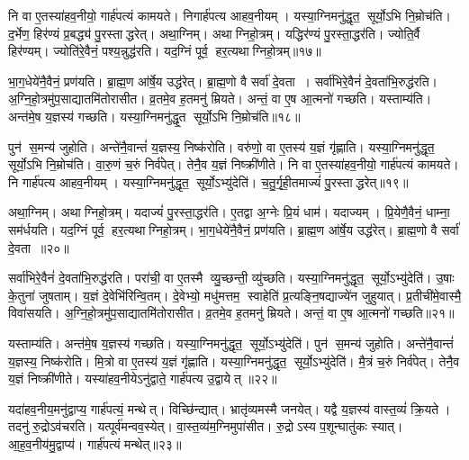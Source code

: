 नि वा ए॒तस्या॑हव॒नीयो॒ गार्\mbox{}ह॑पत्यं कामयते।
निगार्\mbox{}ह॑पत्य आहव॒नीयम्।
यस्या॒ग्निमनु॑द्धृत॒ सूर्यो॒ऽभि नि॒म्रोच॑ति।
द॒र्भेण॒ हिर॑ण्यं प्र॒बद्ध्य॑ पु॒रस्ताद्धरेत्।
अथा॒ग्निम्।
अथाग्निहो॒त्रम्।
यद्धिर॑ण्यं पु॒रस्ता॒द्धर॑ति।
ज्योति॒र्वै हिर॑ण्यम्।
ज्योति॑रे॒वैनं॒ पश्य॒न्नुद्ध॑रति।
यद॒ग्निं पूर्व॒ हर॒त्यथाग्निहो॒त्रम्॥१७॥

भा॒ग॒धेये॑नै॒वैनं॒ प्रण॑यति।
ब्रा॒ह्म॒ण आ॑र्\mbox{}षे॒य उद्ध॑रेत्।
ब्रा॒ह्म॒णो वै सर्वा॑ दे॒वता।
सर्वा॑भिरे॒वैनं॑ दे॒वता॑भि॒रुद्ध॑रति।
अ॒ग्नि॒हो॒त्रमु॑प॒साद्यातमि॑तोरासीत।
व्र॒तमे॒व ह॒तमनु॑ म्रियते।
अन्तं॒ वा ए॒ष आ॒त्मनो॑ गच्छति।
यस्ताम्य॑ति।
अन्त॑मे॒ष य॒ज्ञस्य॑ गच्छति।
यस्या॒ग्निमनु॑द्धृ॒त सूर्यो॒ऽभि नि॒म्रोच॑ति॥१८॥

पुन॑ स॒मन्य॑ जुहोति।
अन्ते॑नै॒वान्तं॑ य॒ज्ञस्य॒ निष्क॑रोति।
वरु॑णो॒ वा ए॒तस्य॑ य॒ज्ञं गृ॑ह्णाति।
यस्या॒ग्निमनु॑द्धृत॒ सूर्यो॒ऽभि नि॒म्रोच॑ति।
वा॒रु॒णं च॒रुं निर्व॑पेत्।
तेनै॒व य॒ज्ञं निष्क्री॑णीते।
नि वा ए॒तस्या॑हव॒नीयो॒ गार्\mbox{}ह॑पत्यं कामयते।
नि गार्\mbox{}ह॑पत्य आहव॒नीयम्।
यस्या॒ग्निमनु॑द्धृत॒ सूर्यो॒ऽभ्यु॑देति॑।
च॒तु॒र्गृ॒ही॒तमाज्यं॑ पु॒रस्ताद्धरेत्॥१९॥

अथा॒ग्निम्।
अथाग्निहो॒त्रम्।
यदाज्यं॑ पु॒रस्ता॒द्धर॑ति।
ए॒तद्वा अ॒ग्नेः प्रि॒यं धाम॑।
यदाज्यम्।
प्रि॒येणै॒वैनं॒ धाम्ना॒ सम॑र्धयति।
यद॒ग्निं पूर्व॒ हर॒त्यथाग्निहो॒त्रम्।
भा॒ग॒धेये॑नै॒वैनं॒ प्रण॑यति।
ब्रा॒ह्म॒ण आ॑र्\mbox{}षे॒य उद्ध॑रेत्।
ब्रा॒ह्म॒णो वै सर्वा॑ दे॒वता॥२०॥

सर्वा॑भिरे॒वैनं॑ दे॒वता॑भि॒रुद्ध॑रति।
परा॑ची॒ वा ए॒तस्मै व्यु॒च्छन्ती॒ व्यु॑च्छति।
यस्या॒ग्निमनु॑द्धृत॒ सूर्यो॒ऽभ्यु॑देति॑।
उ॒षाः के॒तुना॑ जुषताम्।
य॒ज्ञं दे॒वेभि॑रिन्वि॒तम्।
दे॒वेभ्यो॒ मधु॑मत्तम॒ स्वाहेति॑ प्र॒त्यङ्नि॒षद्याज्ये॑न जुहुयात्।
प्र॒तीची॑मे॒वास्मै॒ विवा॑सयति।
अ॒ग्नि॒हो॒त्रमु॑प॒साद्यातमि॑तोरासीत।
व्र॒तमे॒व ह॒तमनु॑ म्रियते।
अन्तं॒ वा ए॒ष आ॒त्मनो॑ गच्छति॥२१॥

यस्ताम्य॑ति।
अन्त॑मे॒ष य॒ज्ञस्य॑ गच्छति।
यस्या॒ग्निमनु॑द्धृत॒ सूर्यो॒ऽभ्यु॑देति॑।
पुन॑ स॒मन्य॑ जुहोति।
अन्ते॑नै॒वान्तं॑ य॒ज्ञस्य॒ निष्क॑रोति।
मि॒त्रो वा ए॒तस्य॑ य॒ज्ञं गृ॑ह्णाति।
यस्या॒ग्निमनु॑द्धृत॒ सूर्यो॒ऽभ्यु॑देति॑।
मै॒त्रं च॒रुं निर्व॑पेत्।
तेनै॒व य॒ज्ञं निष्क्री॑णीते।
यस्या॑हव॒नीयेऽनु॑द्वाते॒ गार्\mbox{}ह॑पत्य उ॒द्वायेत् ॥२२॥

यदा॑हव॒नीय॒मनु॑द्वाप्य॒ गार्\mbox{}ह॑पत्यं॒ मन्थेत्।
विच्छि॑न्द्यात्।
भ्रातृ॑व्यमस्मै जनयेत्।
यद्वै य॒ज्ञस्य॑ वास्त॒व्यं॑ क्रि॒यते।
तदनु॑ रु॒द्रोऽव॑चरति।
यत्पूर्व॑मन्वव॒स्येत्।
वा॒स्त॒व्य॑म॒ग्निमुपा॑सीत।
रु॒द्रोऽस्य प॒शून्घातु॑कः स्यात्।
आ॒ह॒व॒नीय॑मु॒द्वाप्य॑।
गार्\mbox{}ह॑पत्यं मन्थेत्॥२३॥

